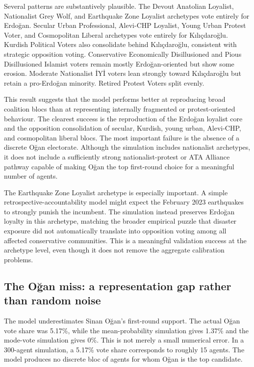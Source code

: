 \documentclass[pdflatex,sn-mathphys-num,iicol]{sn-jnl}
\begin{document}
Several patterns are substantively plausible. The Devout Anatolian Loyalist, Nationalist Grey Wolf, and Earthquake Zone Loyalist archetypes vote entirely for Erdoğan. Secular Urban Professional, Alevi-CHP Loyalist, Young Urban Protest Voter, and Cosmopolitan Liberal archetypes vote entirely for Kılıçdaroğlu. Kurdish Political Voters also consolidate behind Kılıçdaroğlu, consistent with strategic opposition voting. Conservative Economically Disillusioned and Pious Disillusioned Islamist voters remain mostly Erdoğan-oriented but show some erosion. Moderate Nationalist İYİ voters lean strongly toward Kılıçdaroğlu but retain a pro-Erdoğan minority. Retired Protest Voters split evenly.

This result suggests that the model performs better at reproducing broad coalition blocs than at representing internally fragmented or protest-oriented behaviour. The clearest success is the reproduction of the Erdoğan loyalist core and the opposition consolidation of secular, Kurdish, young urban, Alevi-CHP, and cosmopolitan liberal blocs. The most important failure is the absence of a discrete Oğan electorate. Although the simulation includes nationalist archetypes, it does not include a sufficiently strong nationalist-protest or ATA Alliance pathway capable of making Oğan the top first-round choice for a meaningful number of agents.

The Earthquake Zone Loyalist archetype is especially important. A simple retrospective-accountability model might expect the February 2023 earthquakes to strongly punish the incumbent. The simulation instead preserves Erdoğan loyalty in this archetype, matching the broader empirical puzzle that disaster exposure did not automatically translate into opposition voting among all affected conservative communities. This is a meaningful validation success at the archetype level, even though it does not remove the aggregate calibration problems.

\subsection{The Oğan miss: a representation gap rather than random noise}\label{subsec:ogan}

The model underestimates Sinan Oğan's first-round support. The actual Oğan vote share was 5.17\%, while the mean-probability simulation gives 1.37\% and the mode-vote simulation gives 0\%. This is not merely a small numerical error. In a 300-agent simulation, a 5.17\% vote share corresponds to roughly 15 agents. The model produces no discrete bloc of agents for whom Oğan is the top candidate.
\end{document}
